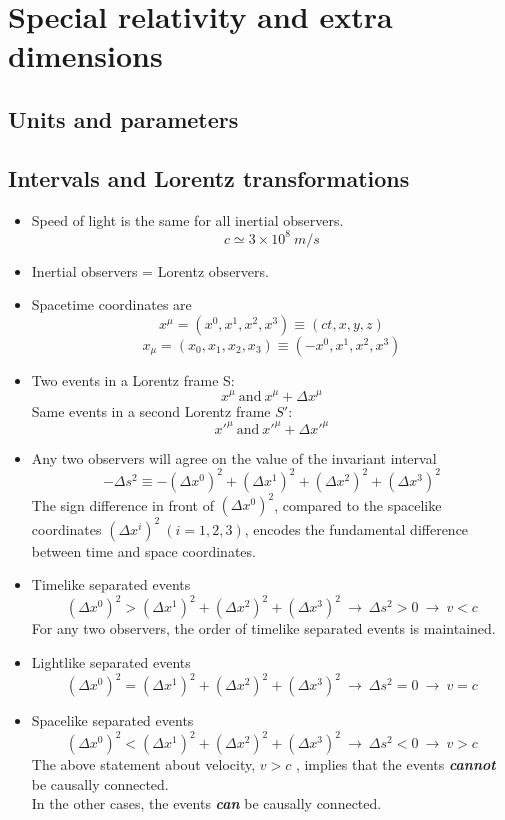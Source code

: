 \documentclass[12pt]{report}
\begin{document}
\chapter{Special relativity and extra dimensions}
\newpage
\section{Units and parameters}
\section{Intervals and Lorentz transformations}
\begin{itemize}
    \item Speed of light is the same for all inertial observers.
$$c\simeq3\times10^8\ m/s$$
    \item Inertial observers = Lorentz observers.
    \item Spacetime coordinates are$$x^\mu=(x^0, x^1, x^2, x^3)\equiv(ct, x, y, z)$$ $$x_\mu = (x_0, x_1, x_2, x_3)\equiv(-x^0, x^1, x^2, x^3)$$
    \item Two events in a Lorentz frame S:$$x^\mu\ \textrm{and}\ x^\mu + \Delta x^\mu$$
    Same events in a second Lorentz frame $S'$:$$x'^\mu\ \textrm{and}\ x'^\mu + \Delta x'^\mu$$
    \item Any two observers will agree on the value of the invariant interval $$ -\Delta s^2\equiv-(\Delta x^0)^2+(\Delta x^1)^2+(\Delta x^2)^2+(\Delta x^3)^2$$
    The sign difference in front of $(\Delta x^0)^2$, compared to the spacelike coordinates $ (\Delta x^i)^2\ (i=1,2,3)$, encodes the fundamental difference between time and space coordinates.
    \item Timelike separated events $$ (\Delta x^0)^2 > (\Delta x^1)^2 + (\Delta x^2)^2 + (\Delta x^3)^2 \ \longrightarrow \ \Delta s^2 > 0 \ \longrightarrow \ v<c$$
    For any two observers, the order of timelike separated events is maintained.
    \item Lightlike separated events $$ (\Delta x^0)^2 = (\Delta x^1)^2 + (\Delta x^2)^2 + (\Delta x^3)^2 \ \longrightarrow \ \Delta s^2 = 0 \ \longrightarrow \ v=c$$
    \item Spacelike separated events $$ (\Delta x^0)^2 < (\Delta x^1)^2 + (\Delta x^2)^2 + (\Delta x^3)^2 \ \longrightarrow \ \Delta s^2 < 0 \ \longrightarrow \ v>c$$ 
    The above statement about velocity, $v>c$ , implies that the events \textbf{\textit{cannot}} be causally connected. \\ In the other cases, the events \textbf{\textit{can}} be causally connected.

\end{itemize}
\end{document}
